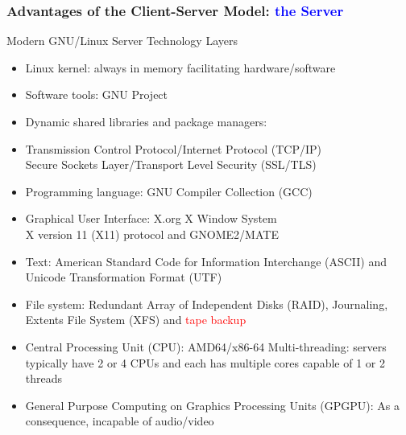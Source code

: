 \documentclass[11pt,pdftex,dvipsnames,usenames,helvetica]{beamer}
\begin{document}
\begin{frame}
\frametitle{Advantages of the Client-Server Model: \textcolor{blue}{the Server}}
Modern GNU/Linux Server Technology Layers
\begin{itemize}
\item Linux kernel:  always in memory facilitating hardware/software
\item Software tools:
    	  GNU Project
\item Dynamic shared libraries and package managers:
\item %
	  Transmission Control Protocol/Internet Protocol (TCP/IP)\\
Secure Sockets Layer/Transport Level Security (SSL/TLS) %
\item Programming language: 
	  GNU Compiler Collection (GCC)%
\item Graphical User Interface:
	  X.org X Window System\\ X version 11 (X11) protocol
	  and GNOME2/MATE
\item Text: 
American Standard Code for Information Interchange (ASCII)
and Unicode Transformation Format (UTF)
\item File system:
     Redundant Array of Independent Disks (RAID), 
     Journaling,
Extents File System (XFS) and \textcolor{red}{tape backup}
\item Central Processing Unit (CPU):
AMD64/x86-64
     Multi-threading: servers typically have 2 or 4 CPUs and each has multiple cores capable of 1 or 2 threads %
\item General Purpose Computing on Graphics Processing Units (GPGPU):
     As a consequence, incapable of audio/video 
\end{itemize}

\end{frame}
\end{document}
